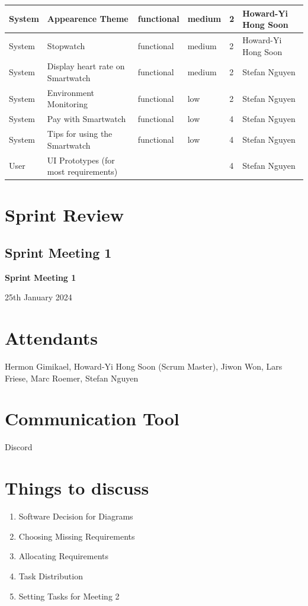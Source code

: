 \documentclass{article}
\begin{document}
\begin{center}
\begin{tabularx}{\textwidth}{|p{}|X|p{}|p{}|p{}|p{}|}
        System & Appearence Theme & functional & medium & 2 & Howard-Yi Hong Soon \\ \hline
        System & Stopwatch & functional & medium & 2 & Howard-Yi Hong Soon \\ \hline
        System & Display heart rate on Smartwatch & functional & medium &  2 & Stefan Nguyen \\ \hline
        System & Environment Monitoring & functional & low &  2 & Stefan Nguyen \\ \hline
        System & Pay with Smartwatch & functional & low &  4 & Stefan Nguyen \\ \hline
        System & Tips for using the Smartwatch & functional & low &  4 & Stefan Nguyen \\ \hline
        User & UI Prototypes (for most requirements) &  &  &  4 & Stefan Nguyen \\ \hline


	\end{tabularx}
\end{center}

\newpage


\section{Sprint Review}
\subsection{Sprint Meeting 1}
\begin{center}
    {\Large \textbf{Sprint Meeting 1}}
    
    \vspace{0.5cm}
    
    {\large 25th January 2024}
\end{center}

\section*{Attendants}
Hermon Gimikael, Howard-Yi Hong Soon (Scrum Master), Jiwon Won, Lars Friese, Marc Roemer, Stefan Nguyen

\section*{Communication Tool}
Discord

\section*{Things to discuss}
\begin{enumerate}
    \item Software Decision for Diagrams
    \item Choosing Missing Requirements
    \item Allocating Requirements
    \item Task Distribution
    \item Setting Tasks for Meeting 2
\end{enumerate}
\end{document}
